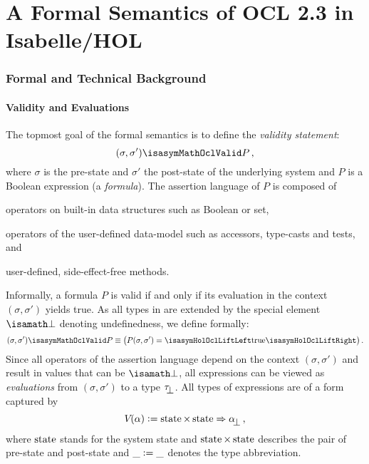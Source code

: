 \part{A Formal Semantics of OCL 2.3 in Isabelle/HOL}
\section{Formal and Technical Background}
\subsection{Validity and Evaluations}
The topmost goal of the formal semantics is to define the
\emph{validity statement}:
\begin{equation*}
   (\sigma, \sigma') \isasymMathOclValid P\mi{,}
\end{equation*}
where $\sigma$ is the pre-state and $\sigma'$ the post-state of the
underlying system and $P$ is a Boolean expression (a
\emph{formula}). The assertion language of $P$ is composed of
\begin{inparaenum}[1)]
\item operators on built-in data structures such as Boolean or set,
\item operators of the user-defined data-model such as accessors,
  type-casts and tests, and
\item user-defined, side-effect-free methods.
\end{inparaenum}
Informally, a formula $P$ is valid if and only if its evaluation in
the context $(\sigma, \sigma')$ yields true. As all types in \holocl
are extended by the special element $\isasymbottom$ denoting
undefinedness, we define formally:
\begin{equation*}
(\sigma, \sigma') \isasymMathOclValid P \equiv \bigl(P(\sigma, \sigma') =
\lift{\HolTrue}\bigr)\mi{.}
\end{equation*}
Since all operators of the assertion language depend on the context $(\sigma,
\sigma')$ and result in values that can be $\isasymbottom$, all expressions can
be viewed as \emph{evaluations} from $(\sigma, \sigma')$ to a type $\up{\tau}$.
All types of expressions are of a form captured by
 \begin{equation*}
 \V{}{\alpha} \defeq \state{} \times \state{} \to \up{\alpha}  \mi{,}
 \end{equation*}
where $\state{}$ stands for the system state and $\state{} \times
\state{}$ describes the pair of pre-state and post-state and
$\_\mathrel{\mathop:}=\_$ denotes the type abbreviation.

